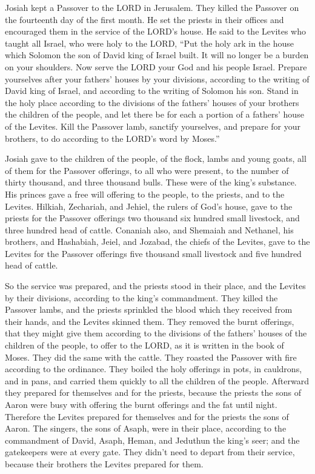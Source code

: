 \mychapter{} \myverse*{}Josiah kept a Passover to the LORD in Jerusalem. They killed the
Passover on the fourteenth day of the first month.
\myverse{}He set the priests in their offices and encouraged them in the service of the
LORD’s house.
\myverse{}He said to the Levites who taught all Israel, who were holy to the LORD, “Put
the holy ark in the house which Solomon the son of David king of Israel built. It will no longer be a
burden on your shoulders. Now serve the LORD your God and his people Israel.
\myverse{}Prepare yourselves after your fathers’ houses by your divisions, according
to the writing of David king of Israel, and according to the writing of Solomon his son.
\myverse{}Stand in the holy place according to the divisions of the fathers’ houses of
your brothers the children of the people, and let there be for each a portion of a fathers’ house of the
Levites.
\myverse{}Kill the Passover lamb, sanctify yourselves, and prepare for your brothers,
to do according to the LORD’s word by Moses.”

\myverse{}Josiah gave to the children of the people, of the flock, lambs
and young goats, all of them for the Passover offerings, to all who were present, to the number of thirty
thousand, and three thousand bulls. These were of the king’s substance.
\myverse{}His princes gave a free will offering to the people, to the priests, and to
the Levites. Hilkiah, Zechariah, and Jehiel, the rulers of God’s house, gave to the priests for the Passover
offerings two thousand six hundred small livestock, and three hundred head of cattle.
\myverse{}Conaniah also, and Shemaiah and Nethanel, his brothers, and Hashabiah, Jeiel,
and Jozabad, the chiefs of the Levites, gave to the Levites for the Passover offerings five thousand small
livestock and five hundred head of cattle.

\myverse{}So the service was prepared, and the priests stood in their
place, and the Levites by their divisions, according to the king’s commandment.
\myverse{}They killed the Passover lambs, and the priests sprinkled the blood which
they received from their hands, and the Levites skinned them.
\myverse{}They removed the burnt offerings, that they might give them according to
the divisions of the fathers’ houses of the children of the people, to offer to the LORD, as it is written
in the book of Moses. They did the same with the cattle.
\myverse{}They roasted the Passover with fire according to the ordinance. They boiled
the holy offerings in pots, in cauldrons, and in pans, and carried them quickly to all the children of
the people.
\myverse{}Afterward they prepared for themselves and for the priests, because the priests
the sons of Aaron were busy with offering the burnt offerings and the fat until night. Therefore the Levites
prepared for themselves and for the priests the sons of Aaron.
\myverse{}The singers, the sons of Asaph, were in their place, according to the commandment
of David, Asaph, Heman, and Jeduthun the king’s seer; and the gatekeepers were at every gate. They didn’t
need to depart from their service, because their brothers the Levites prepared for them.

